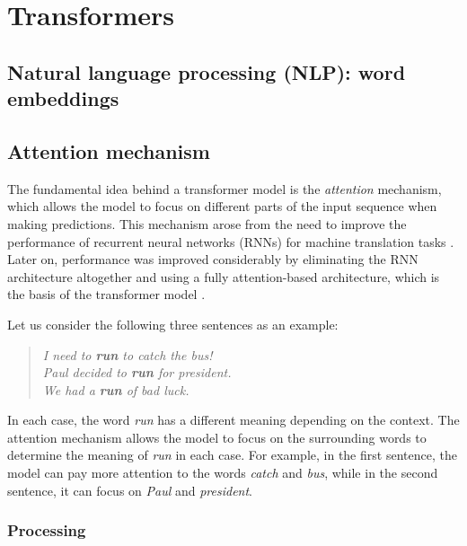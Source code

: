 \section{Transformers}\label{sec:transformers}

\subsection{Natural language processing (NLP): word embeddings}\label{subsec:nlp_word_embeddings}


\subsection{Attention mechanism}\label{subsec:attention_mechanism}

The fundamental idea behind a transformer model is the \emph{attention} mechanism, which allows the model to focus on different parts of the input sequence when making predictions. This mechanism arose from the need to improve the performance of recurrent neural networks (RNNs) for machine translation tasks \cite{bahdanauNeuralMachineTranslation2016}. Later on, performance was improved considerably by eliminating the RNN architecture altogether and using a fully attention-based architecture, which is the basis of the transformer model \cite{vaswaniAttentionAllYou2017}. 


Let us consider the following three sentences as an example:

\begin{quote}
    \textit{I need to \textbf{run} to catch the bus!}  \\
    \textit{Paul decided to \textbf{run} for president.} \\
    \textit{We had a \textbf{run} of bad luck.} 
\end{quote}

In each case, the word \textit{run} has a different meaning depending on the context. The attention mechanism allows the model to focus on the surrounding words to determine the meaning of \textit{run} in each case. For example, in the first sentence, the model can pay more attention to the words \textit{catch} and \textit{bus}, while in the second sentence, it can focus on \textit{Paul} and \textit{president}.

\subsubsection{Processing}\label{subsubsec:processing}

